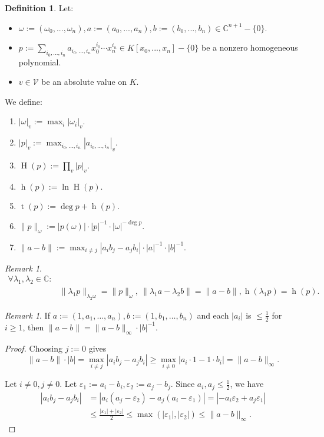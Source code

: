 \documentclass[reqno]{amsart}
\theoremstyle{plain}
\theoremstyle{definition}
\newtheorem{Def}[Cor]{Definition}
\theoremstyle{remark}
\newtheorem{Rem}[Cor]{Remark}
\theoremstyle{plain}
\begin{document}
\begin{Def}\label{Definition basic definitions}
Let:
\begin{itemize}
\item $\omega:=(\omega_0,...,\omega_n),a:=(a_0,...,a_n),b:=(b_0,...,b_n)\in\mathbb C^{n+1}-\{0\}$.
    \item $p:=\sum_{i_0,...,i_n}a_{i_0,...,i_n}x_0^{i_0}\cdots x_n^{i_n}\in K[x_0,...,x_n]-\{0\}$ be a nonzero homogeneous polynomial.
    \item $v\in\mathcal V$ be an absolute value on $K$.
\end{itemize}

We define:
\begin{enumerate}
\item $|\omega|_v:=\max_i|\omega_i|_v$.
    \item $|p|_v:=\max_{i_0,...,i_n}|a_{i_0,...,i_n}|_v$.
    \item $\operatorname{H}(p):=\prod_v|p|_v$.
    \item $\operatorname{h}(p):=\ln\operatorname{H}(p)$.
    \item $\operatorname{t}(p):=\deg p+\operatorname{h}(p)$.
    \item $\|p\|_\omega:=|p(\omega)|\cdot|p|^{-1}\cdot|\omega|^{-\deg p}$.
    \item $\|a-b\|:=\max_{i\neq j}|a_i b_j-a_j b_i|\cdot|a|^{-1}\cdot|b|^{-1}$.
\end{enumerate}
\end{Def}

\begin{Rem}
\begin{align*}  
        \forall\lambda_1,\lambda_2\in\mathbb C:
        &\\&\|\lambda_1 p\|_{\lambda_2 \omega}=\|p\|_\omega,\ \|\lambda_1 a-\lambda_2 b\|=\|a-b\|,\operatorname{h}(\lambda_1 p)=\operatorname{h}(p)
.\end{align*}
\end{Rem}

\begin{Rem}\label{Remark projective vs affine distance}
    If $a:=(1,a_1,\ldots,a_n), b:=(1,b_1,\ldots,b_n)$ and each $|a_i|$ is $\leq\frac12$ for $i\geq 1$, then $\|a-b\|=\|a-b\|_\infty\cdot|b|^{-1}$.
\end{Rem}

\begin{proof}
Choosing $j:=0$ gives
\[
    \|a-b\|\cdot|b|
        =
    \max_{i\neq j}|a_i b_j-a_j b_i|
        \geq
    \max_{i\neq 0}|a_i\cdot 1 - 1\cdot b_i|
        =
    \|a-b\|_\infty
.\]

Let $i\neq 0,j\neq 0$. Let $\varepsilon_1:=a_i-b_i,\varepsilon_2:=a_j-b_j$. Since $a_i,a_j\leq\frac12$, we have
\begin{align*}
    |a_i b_j - a_j b_i| 
    &= |a_i (a_j - \varepsilon_2) - a_j (a_i - \varepsilon_1)| 
    = |-a_i \varepsilon_2 + a_j \varepsilon_1| \\
    &\leq \frac{|\varepsilon_1| + |\varepsilon_2|}{2} 
    \leq \max(|\varepsilon_1|, |\varepsilon_2|)
    \leq \|a - b\|_\infty
.\end{align*}
\end{proof}
\end{document}
